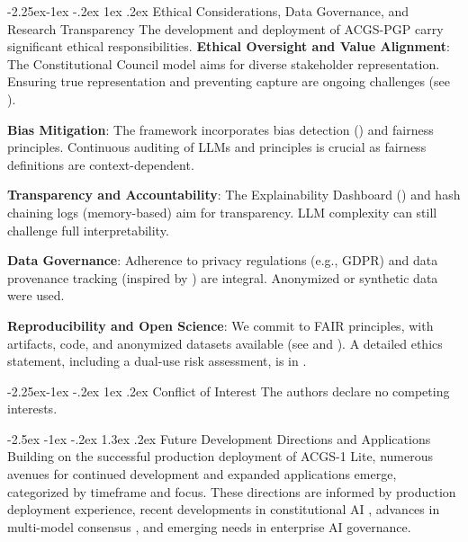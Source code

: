 \documentclass[manuscript,screen,9pt]{acmart}
\makeatletter
\renewcommand\section{\@startsection{section}{1}{\z@}%
  {-2.5ex \@plus -1ex \@minus -.2ex}%
  {1.3ex \@plus.2ex}%
  {\normalfont\Large\bfseries}}
\renewcommand\subsection{\@startsection{subsection}{2}{\z@}%
  {-2.25ex\@plus -1ex \@minus -.2ex}%
  {1ex \@plus .2ex}%
  {\normalfont\large\bfseries}}
\makeatother
\begin{document}
\subsection{Ethical Considerations, Data Governance, and Research Transparency}
\label{subsec:ethics_governance_reproducibility}
The development and deployment of ACGS-PGP carry significant ethical responsibilities.
\noindent\textbf{Ethical Oversight and Value Alignment}: The Constitutional Council model aims for diverse stakeholder representation. Ensuring true representation and preventing capture are ongoing challenges (see ).

\noindent\textbf{Bias Mitigation}: The framework incorporates bias detection () and fairness principles. Continuous auditing of LLMs and principles is crucial as fairness definitions are context-dependent.

\noindent\textbf{Transparency and Accountability}: The Explainability Dashboard () and hash chaining logs (memory-based) aim for transparency. LLM complexity can still challenge full interpretability.

\noindent\textbf{Data Governance}: Adherence to privacy regulations (e.g., GDPR) and data provenance tracking (inspired by \cite{Gebru2021DatasheetDatasets}) are integral. Anonymized or synthetic data were used.

\noindent\textbf{Reproducibility and Open Science}: We commit to FAIR principles, with artifacts, code, and anonymized datasets available (see  and ).
A detailed ethics statement, including a dual-use risk assessment, is in .

\subsection{Conflict of Interest}
The authors declare no competing interests.

\section{Future Development Directions and Applications}
\label{sec:future_work}
Building on the successful production deployment of ACGS-1 Lite, numerous avenues for continued development and expanded applications emerge, categorized by timeframe and focus. These directions are informed by production deployment experience, recent developments in constitutional AI \citep{Abiri2024PublicConstitutionalAI, C3AI2025Framework}, advances in multi-model consensus \citep{Naik2024ProbabilisticConsensus}, and emerging needs in enterprise AI governance.
\end{document}
